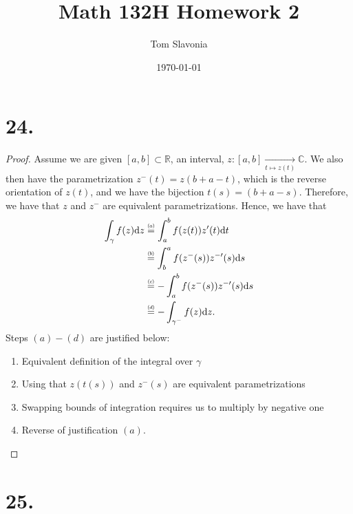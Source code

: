 \documentclass{article}
\title{Math 132H Homework 2}
\author{Tom Slavonia}
\date{\today}
\newcommand\numeq[1]%
  {\stackrel{\scriptscriptstyle(\mkern-1.5mu#1\mkern-1.5mu)}{=}}
\begin{document}
\maketitle

\section*{24.}
\begin{proof}
Assume we are given $[a, b] \subset \mathbb{R}$, an interval, $z: [a, b] \xrightarrow[t \mapsto z(t)]{} \mathbb{C}$. We also then have the parametrization $z^-(t) = z(b + a - t)$, which is the reverse orientation of $z(t)$, and we have the bijection $t(s) = (b + a - s)$. Therefore, we have that $z$ and $z^-$ are equivalent parametrizations. Hence, we have that 
\begin{align*}
  \int_{\gamma} f(z) \mathrm{d}z &\numeq{a} \int_a^b f(z(t)) z^{\prime}(t) \mathrm{d}t \\
  &\numeq{b} \int_b^a f(z^-(s))z^{- \prime}(s) \mathrm{d}s \\
  &\numeq{c} -\int_a^bf(z^-(s))z^{-\prime}(s) \mathrm{d}s \\
  &\numeq{d} - \int_{\gamma^-}f(z) \mathrm{d}z. \\ 
\end{align*}
Steps $(a) - (d)$ are justified below:
\begin{enumerate}[\indent(a)]
  \item Equivalent definition of the integral over $\gamma$
  \item Using that $z(t(s))$ and $z^-(s)$ are equivalent parametrizations
  \item Swapping bounds of integration requires us to multiply by negative one
  \item Reverse of justification $(a)$.
\end{enumerate} 



\end{proof}

\section*{25.}
\end{document}
